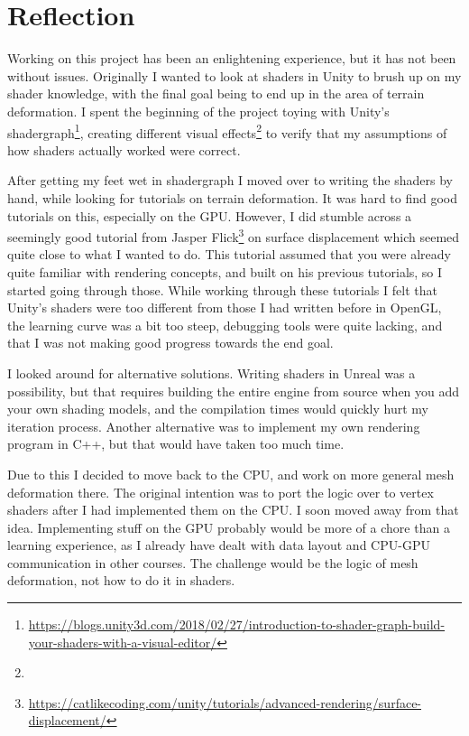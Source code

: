 \chapter{Reflection}
Working on this project has been an enlightening experience, but it has not been without issues.
Originally I wanted to look at shaders in Unity to brush up on my shader knowledge, with the final goal being to end up in the area of terrain deformation.
I spent the beginning of the project toying with Unity's shadergraph\footnote{\url{https://blogs.unity3d.com/2018/02/27/introduction-to-shader-graph-build-your-shaders-with-a-visual-editor/}}, creating different visual effects\footnote{} to verify that my assumptions of how shaders actually worked were correct. 

After getting my feet wet in shadergraph I moved over to writing the shaders by hand, while looking for tutorials on terrain deformation.
It was hard to find good tutorials on this, especially on the GPU. However, I did stumble across a seemingly good tutorial from Jasper Flick\footnote{\url{https://catlikecoding.com/unity/tutorials/advanced-rendering/surface-displacement/}} 
on surface displacement which seemed quite close to what I wanted to do.
This tutorial assumed that you were already quite familiar with rendering concepts, and built on his previous tutorials, so I started going through those.
While working through these tutorials I felt that Unity's shaders were too different from those I had written before in OpenGL, the learning curve
was a bit too steep, debugging tools were quite lacking, and that I was not making good progress towards the end goal.

I looked around for alternative solutions. Writing shaders in Unreal was a possibility, but that requires building the entire engine from source
when you add your own shading models\cite{unreal_shaders}, and the compilation times would quickly hurt my iteration process.
Another alternative was to implement my own rendering program in C++, but that would have taken too much time.

Due to this I decided to move back to the CPU, and work on more general mesh deformation there.
The original intention was to port the logic over to vertex shaders after I had implemented them on the CPU.
I soon moved away from that idea. Implementing stuff on the GPU probably would be more of a chore than a learning experience,
as I already have dealt with data layout and CPU-GPU communication in other courses.
The challenge would be the logic of mesh deformation, not how to do it in shaders.

